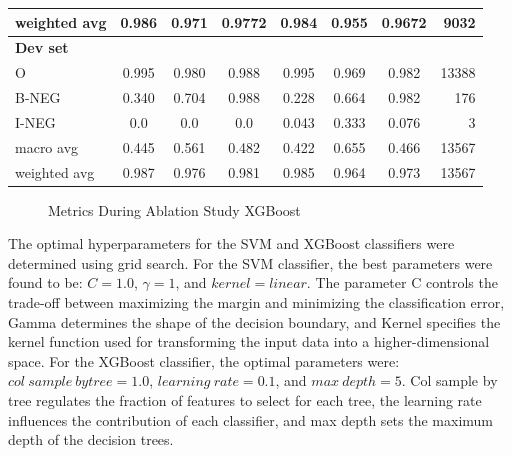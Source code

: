 \begin{table}[!ht]
\begin{tabular}{lccc|cccr}
weighted avg       &  0.986 &  0.971 &  0.9772 & 0.984 & 0.955 & 0.9672 & 9032 \\
\hline
\textbf{Dev set}   &        &        &        &       &       & &   \\
O                  &  0.995 &  0.980 &  0.988 & 0.995 & 0.969 & 0.982 & 13388 \\
B-NEG              &  0.340 &  0.704 &  0.988 & 0.228 & 0.664 & 0.982 & 176 \\
I-NEG              &  0.0   &  0.0   &  0.0   & 0.043 & 0.333 & 0.076 & 3 \\
macro avg          &  0.445 &  0.561 &  0.482 & 0.422 & 0.655 & 0.466 & 13567 \\
weighted avg       &  0.987 &  0.976 &  0.981 & 0.985 & 0.964 & 0.973 & 13567 \\
\hline
\end{tabular}
\end{table}



\begin{figure}[!ht]
\centering
  \caption{Metrics During Ablation Study XGBoost}
  \label{fig:metrics_xgb_training}
\end{figure}

The optimal hyperparameters for the SVM and XGBoost classifiers were determined using grid search. For the SVM classifier, the best parameters were found to be: $ C = 1.0 $, $ \gamma = 1 $, and $ kernel = linear $. The parameter C controls the trade-off between maximizing the margin and minimizing the classification error, Gamma determines the shape of the decision boundary, and Kernel specifies the kernel function used for transforming the input data into a higher-dimensional space. For the XGBoost classifier, the optimal parameters were: $col \ sample \ bytree= 1.0$, $learning \ rate = 0.1$, and $max \ depth = 5$. Col sample by tree regulates the fraction of features to select for each tree, the learning rate influences the contribution of each classifier, and max depth sets the maximum depth of the decision trees.



